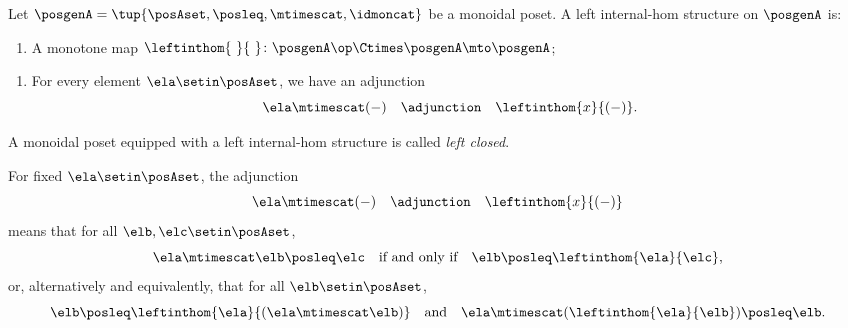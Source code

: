 \begin{ctdefinition}
    \label{def:left-internal-hom-monoidal-poset}
    Let $\posgenA = \tup{\posAset, \posleq, \mtimescat, \idmoncat}$ be a monoidal poset.
    A left internal-hom structure on $\posgenA$ is:

    \constit
    \begin{enumerate}
        \item A monotone map $\leftinthom{\ }{\ } \colon \posgenA\op \Ctimes \posgenA \mto \posgenA$;
    \end{enumerate}

    \condit
    \begin{enumerate}
        \item For every element $\ela \setin \posAset$, we have an adjunction
              \begin{equation}
                  \ela \mtimescat ( - ) \quad \adjunction \quad \leftinthom{x}{( - )}.
              \end{equation}
    \end{enumerate}
    A monoidal poset equipped with a left internal-hom structure is called \emph{left closed}.
\end{ctdefinition}

\begin{remark}
    \label{rem:left-internal-hom-unpacked-monoidal-poset}
    For fixed $\ela \setin \posAset$, the adjunction
    \begin{equation}
        \ela \mtimescat ( - ) \quad \adjunction \quad \leftinthom{x}{( - )}
    \end{equation}
    means that for all $\elb, \elc \setin \posAset$,
    \begin{equation}
        \ela \mtimescat \elb \posleq \elc \quad \text{if and only if} \quad \elb \posleq \leftinthom{\ela}{\elc},
    \end{equation}
    or, alternatively and equivalently, that for all $\elb \setin \posAset$,
    \begin{equation}
        \elb \posleq \leftinthom{\ela}{(\ela \mtimescat \elb)} \quad \text{and} \quad \ela \mtimescat (\leftinthom{\ela}{\elb}) \posleq \elb.
    \end{equation}
\end{remark}

